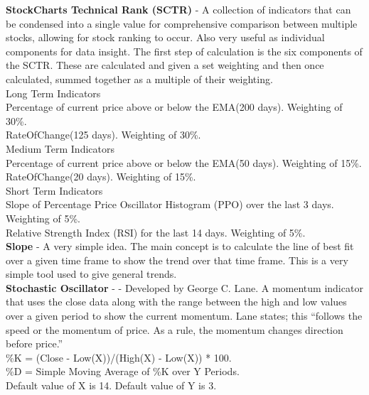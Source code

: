 \documentclass[conference]{IEEEtran}
\begin{document}

\noindent
\textbf{StockCharts Technical Rank (SCTR)} - A collection of indicators that can be condensed into a single value for comprehensive comparison between multiple stocks, allowing for stock ranking to occur. Also very useful as individual components for data insight. The first step of calculation is the six components of the SCTR. These are calculated and given a set weighting and then once calculated, summed together as a multiple of their weighting. \\

\noindent
Long Term Indicators\\
Percentage of current price above or below the EMA(200 days). Weighting of 30\%. \\
RateOfChange(125 days). Weighting of 30\%. \\

\noindent
Medium Term Indicators\\
Percentage of current price above or below the EMA(50 days). Weighting of 15\%. \\
RateOfChange(20 days). Weighting of 15\%. \\

\noindent
Short Term Indicators\\
Slope of Percentage Price Oscillator Histogram (PPO) over the last 3 days. Weighting of 5\%. \\
Relative Strength Index (RSI) for the last 14 days. Weighting of 5\%. \\

\noindent
\textbf{Slope} - A very simple idea. The main concept is to calculate the line of best fit over a given time frame to show the trend over that time frame. This is a very simple tool used to give general trends.\\

\noindent
\textbf{Stochastic Oscillator} - \cite{Murphy1999} - Developed by George C. Lane. A momentum indicator that uses the close data along with the range between the high and low values over a given period to show the current momentum. Lane states; this ``follows the speed or the momentum of price. As a rule, the momentum changes direction before price.'' \\

\noindent
\%K = (Close - Low(X))/(High(X) - Low(X)) * 100.\\
\%D = Simple Moving Average of \%K over Y Periods. \\
Default value of X is 14. Default value of Y is 3.\\
\end{document}
